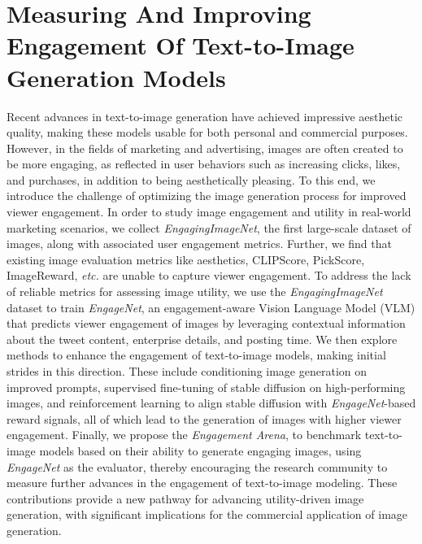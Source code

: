 \section{Measuring And Improving Engagement Of Text-to-Image Generation Models}
Recent advances in text-to-image generation have achieved impressive aesthetic quality, making these models usable for both personal and commercial purposes. However, in the fields of marketing and advertising, images are often created to be more engaging, as reflected in user behaviors such as increasing clicks, likes, and purchases, in addition to being aesthetically pleasing.
To this end, we introduce the challenge of optimizing the image generation process for improved viewer engagement. In order to study image engagement and utility in real-world marketing scenarios, we collect \textit{EngagingImageNet}, the first large-scale dataset of images, along with associated user engagement metrics. 
Further, we find that existing image evaluation metrics like aesthetics, CLIPScore, PickScore, ImageReward, \textit{etc.} are unable to capture viewer engagement.
To address the lack of reliable metrics for assessing image utility, we use the \textit{EngagingImageNet} dataset to train \textit{EngageNet}, an engagement-aware Vision Language Model (VLM) that predicts viewer engagement of images by leveraging contextual information about the tweet content, enterprise details, and posting time. %
We then explore methods to enhance the engagement of text-to-image models, making initial strides in this direction. These include conditioning image generation on improved prompts, supervised fine-tuning of stable diffusion on high-performing images, and reinforcement learning to align stable diffusion with \textit{EngageNet}-based reward signals, all of which lead to the generation of images with higher viewer engagement. Finally, we propose the \textit{Engagement Arena}, to benchmark text-to-image models based on their ability to generate engaging images, using \textit{EngageNet} as the evaluator, thereby encouraging the research community to measure further advances in the engagement of text-to-image modeling. These contributions provide a new pathway for advancing utility-driven image generation, with significant implications for the commercial application of image generation.



